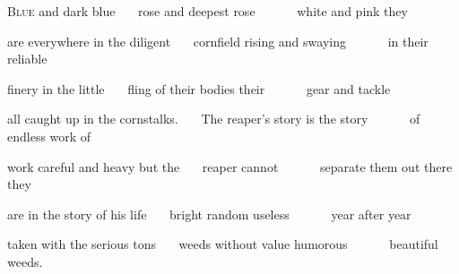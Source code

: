 
\begin{poem}
\begin{stanza}
\textsc{Blue} and dark blue\verseline
~~~rose and deepest rose\verseline
~~~~~~white and pink they
\end{stanza}

\begin{stanza}
are everywhere in the diligent\verseline
~~~cornfield rising and swaying\verseline
~~~~~~in their reliable
\end{stanza}

\begin{stanza}
finery in the little\verseline
~~~fling of their bodies their\verseline
~~~~~~gear and tackle
\end{stanza}

\begin{stanza}
all caught up in the cornstalks.\verseline
~~~The reaper's story is the story\verseline
~~~~~~of endless work of
\end{stanza}

\begin{stanza}
work careful and heavy but the\verseline
~~~reaper cannot\verseline
~~~~~~separate them out there they
\end{stanza}

\begin{stanza}
are in the story of his life\verseline
~~~bright random useless\verseline
~~~~~~year after year
\end{stanza}

\begin{stanza}
taken with the serious tons\verseline
~~~weeds without value humorous\verseline
~~~~~~beautiful weeds.
\end{stanza}
\end{poem}